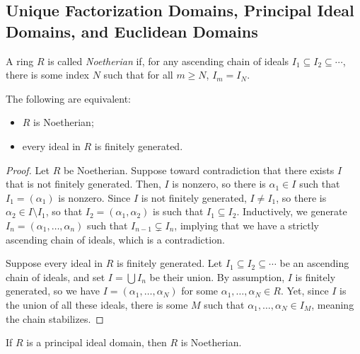 \documentclass[10pt]{mypackage}
\begin{document}
\subsection{Unique Factorization Domains, Principal Ideal Domains, and Euclidean Domains}%
\begin{definition}
  A ring $R$ is called \textit{Noetherian} if, for any ascending chain of ideals $I_1\subseteq I_2\subseteq\cdots$, there is some index $N$ such that for all $m\geq N$, $I_m = I_N$.
\end{definition}
\begin{proposition}
  The following are equivalent:
  \begin{itemize}
    \item $R$ is Noetherian;
    \item every ideal in $R$ is finitely generated.
  \end{itemize}
\end{proposition}
\begin{proof}
  Let $R$ be Noetherian. Suppose toward contradiction that there exists $I$ that is not finitely generated. Then, $I$ is nonzero, so there is $\alpha_1\in I$ such that $I_1 = \left( \alpha_1 \right)$ is nonzero. Since $I$ is not finitely generated, $I\neq I_1$, so there is $\alpha_2\in I\setminus I_1$, so that $I_2 = \left( \alpha_1,\alpha_2 \right)$ is such that $I_1\subseteq I_2$. Inductively, we generate $I_n = \left( \alpha_1,\dots,\alpha_n \right)$ such that $I_{n-1}\subsetneq I_n$, implying that we have a strictly ascending chain of ideals, which is a contradiction.\newline

  Suppose every ideal in $R$ is finitely generated. Let $I_1\subseteq I_2\subseteq\cdots$ be an ascending chain of ideals, and set $I = \bigcup I_n$ be their union. By assumption, $I$ is finitely generated, so we have $I = \left( \alpha_1,\dots,\alpha_N \right)$ for some $\alpha_1,\dots,\alpha_N\in R$. Yet, since $I$ is the union of all these ideals, there is some $M$ such that $\alpha_1,\dots,\alpha_N\in I_M$, meaning the chain stabilizes.
\end{proof}
\begin{corollary}
  If $R$ is a principal ideal domain, then $R$ is Noetherian.
\end{corollary}
\end{document}

